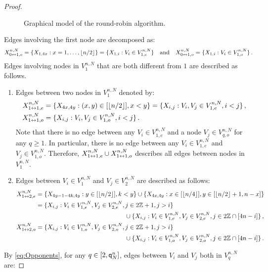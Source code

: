 \begin{proof}
\begin{figure}[h!]
\begin{tikzpicture}
\end{tikzpicture}
\caption{Graphical model of the round-robin algorithm.}
\label{fig:robin:graphicalmodel}
\end{figure}
\noindent Edges involving the first node are decomposed as:
\[
X_{0\link1,e}^{n,N}=\{X_{1,4x} : x=1,\ldots,\PE{n/2}\}=\{X_{1,i} : V_i\in V_{1,e}^{n,N}\}\quad\mbox{and}\quad X_{0\link 1,o}^{n,N}=\{X_{1,i} : V_i\in V_{1,o}^{n,N}\}\eqsp.
\]
Edges involving nodes in $V_{1}^{n,N}$ that are both different from $1$ are described as follows.
\begin{enumerate}[-]
\item  Edges between two nodes in $V_{1}^{n,N}$ denoted by: 
\begin{align*}
X_{1\link1,e}^{n,N}&=\{X_{4x,4y} : (x,y)\in [\PE{n/2}], x< y\}=\{X_{i,j} : V_i,V_j\in V_{1,e}^{n,N},i<j\}\eqsp,\\
X_{1\link1,o}^{n,N}&=\{X_{i,j} : V_i,V_j\in V_{1,o}^{n,N},i<j\}\eqsp. 
\end{align*}
Note that there is no edge between any $V_i\in V_{1,e}^{n,N}$ and a node $V_j\in V_{q,o}^{n,N}$ for any $q\ge 1$. In particular, there is no edge between any $V_i\in V_{1,e}^{n,N}$ and  $V_j\in V_{1,o}^{n,N}$.  Therefore, $X_{1\link1,e}^{n,N}\cup X_{1\link1,o}^{n,N}$ describes all edges between nodes in $V_{1}^{n,N}$. 
\item Edges between $V_i\in V_{1}^{n,N}$ and $V_j\in V_{2}^{n,N}$ are described as follows:
\begin{align*}
X_{1\link2,e}^{n,N}&=\{X_{4y-1-4k,4y} : y\in [\PE{n/2}], k<y\}\cup\{X_{4x,4y} : x\in[\PE{n/4}], y\in[\PE{n/2}+1,n-x]\}\\
&=\{X_{i,j} : V_i\in V_{1,e}^{n,N},V_j\in V_{2,e}^{n,N},j\in 2\bZ+1,j>i\}\\
&\hspace{5cm}\cup\{X_{i,j} : V_i\in V_{1,e}^{n,N},V_j\in V_{2,e}^{n,N},j\in 2\bZ\cap [4n-i]\}\eqsp,\\
X_{1\link2,o}^{n,N}&=\{X_{i,j} : V_i\in V_{1,o}^{n,N},V_j\in V_{2,o}^{n,N},j\in 2\bZ+1,j>i\}\\
&\hspace{5cm}\cup\{X_{i,j} : V_i\in V_{1,o}^{n,N},V_j\in V_{2,o}^{n,N},j\in 2\bZ\cap [4n-i]\}\eqsp.
\end{align*}
\end{enumerate}
By \eqref{eq:Opponents}, for any $q\in [2,\ordermax{n}{N}]$, edges between $V_i$ and $V_j$ both in $V_{q}^{n,N}$ are:

\end{proof}

